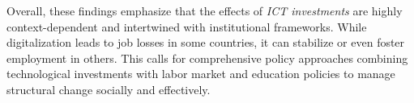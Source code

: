 Overall, these findings emphasize that the effects of \textit{ICT investments} are highly 
context-dependent and intertwined with institutional frameworks. While digitalization leads 
to job losses in some countries, it can stabilize or even foster employment in others. This 
calls for comprehensive policy approaches combining technological investments with labor 
market and education policies to manage structural change socially and effectively.
